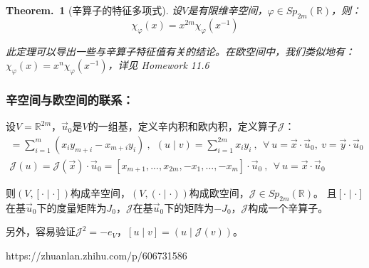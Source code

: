 \documentclass[zihao=-4,UTF8]{report}
\theoremstyle{mystyle} %
\newtheorem{theorem}{Theorem.\,}
\begin{document}
\begin{theorem}[辛算子的特征多项式]\label{辛算子的特征多项式}
    设$V$是有限维辛空间，$\varphi \in Sp_{2m}(\mathbb{R})$，则：
    \begin{equation*}
        \chi_{\varphi}(x) = x^{2m}\chi_{\varphi}(x^{-1})
    \end{equation*}
    {\par\color{gray}\small
    此定理可以导出一些与辛算子特征值有关的结论。在欧空间中，我们类似地有：
    $\chi_{\varphi}(x) = x^n\chi_{\varphi}(x^{-1})$，详见 Homework 11.6
    \par}
\end{theorem}

\subsubsection{辛空间与欧空间的联系：}
设$V = \mathbb{R}^{2m}$，$\vec{u}_0$是$V$的一组基，定义辛内积和欧内积，定义算子$\mathcal{J}$：
\begin{gather*}
    [u\mid v] = \sum_{i=1}^{m}(x_iy_{m+i} - x_{m+i}y_{i})\ ,\ \ (u\mid v) = \sum_{i=1}^{2m}x_iy_i\ ,\ \ \forall\ u = \vec{x}\cdot\vec{u}_0,\ v = \vec{y}\cdot\vec{u}_0\\
    \mathcal{J}(u) = \mathcal{J}(\vec{x})\cdot\vec{u}_0 = [x_{m+1},...,x_{2m},-x_1,...,-x_m]\cdot \vec{u}_0\ ,\ \ \forall\ u = \vec{x}\cdot\vec{u}_0
\end{gather*}\par
则$(V,[\cdot\mid \cdot])$构成辛空间，$(V,(\cdot\mid \cdot))$构成欧空间，$\mathcal{J} \in Sp_{2m}(\mathbb{R})$。
且$[\cdot\mid \cdot]$在基$\vec{u}_0$下的度量矩阵为$J_0$，$\mathcal{J} $在基$\vec{u}_0$下的矩阵为$-J_0$，$\mathcal{J}$构成一个辛算子。
\par
另外，容易验证$\mathcal{J}^2 = -e_V$，$[u\mid v] = (u\mid \mathcal{J}(v))$。\par
https://zhuanlan.zhihu.com/p/606731586
\end{document}

